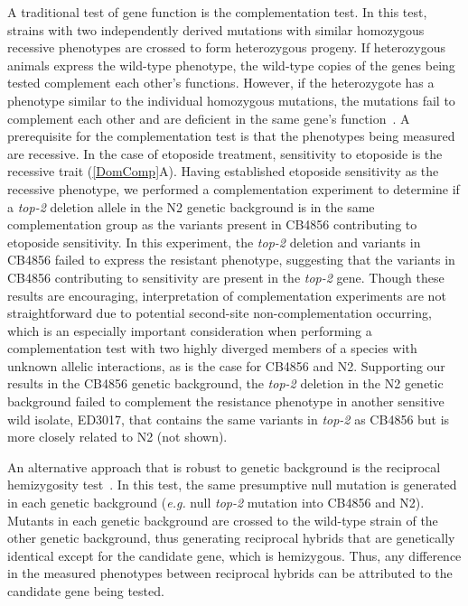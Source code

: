 \documentclass[12pt]{article}
\begin{document}
A traditional test of gene function is the complementation test. In this test, strains with two independently derived mutations with similar homozygous recessive phenotypes are crossed to form heterozygous progeny. If heterozygous animals express the wild-type phenotype, the wild-type copies of the genes being tested complement each other's functions. However, if the heterozygote has a phenotype similar to the individual homozygous mutations, the mutations fail to complement each other and are deficient in the same gene's function~\cite{Hawley:2006gg}. A prerequisite for the complementation test is that the phenotypes being measured are recessive. In the case of etoposide treatment, sensitivity to etoposide is the recessive trait (\autoref{DomComp}A). Having established etoposide sensitivity as the recessive phenotype, we performed a complementation experiment to determine if a {\it top-2} deletion allele in the N2 genetic background is in the same complementation group as the variants present in CB4856 contributing to etoposide sensitivity. In this experiment, the {\it top-2} deletion and variants in CB4856 failed to express the resistant phenotype, suggesting that the variants in CB4856 contributing to sensitivity are present in the {\it top-2} gene. Though these results are encouraging, interpretation of complementation experiments are not straightforward due to potential second-site non-complementation occurring, which is an especially important consideration when performing a complementation test with two highly diverged members of a species with unknown allelic interactions, as is the case for CB4856 and N2. Supporting our results in the CB4856 genetic background, the {\it top-2} deletion in the N2 genetic background failed to complement the resistance phenotype in another sensitive wild isolate, ED3017, that contains the same variants in {\it top-2} as CB4856 but is more closely related to N2 (not shown).

\vspace{5pt}

An alternative approach that is robust to genetic background is the reciprocal hemizygosity test~\cite{Stern:2014jp}. In this test, the same presumptive null mutation is generated in each genetic background ({\it e.g.} null {\it top-2} mutation into CB4856 and N2). Mutants in each genetic background are crossed to the wild-type strain of the other genetic background, thus generating reciprocal hybrids that are genetically identical except for the candidate gene, which is hemizygous. Thus, any difference in the measured phenotypes between reciprocal hybrids can be attributed to the candidate gene being tested. 
\vspace{5pt}
\end{document}
